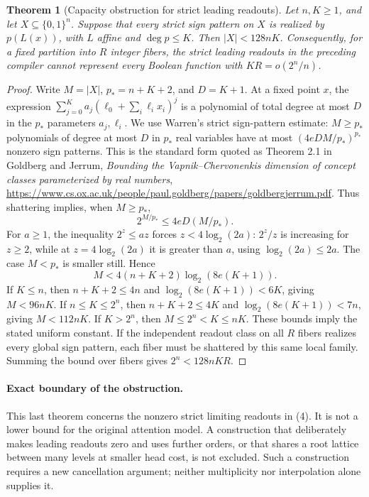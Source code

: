\documentclass[11pt]{article}
\newtheorem{theorem}{Theorem}
\begin{document}
\begin{theorem}[Capacity obstruction for strict leading readouts]
Let $n,K\ge1$, and let $X\subseteq\{0,1\}^n$. Suppose that every strict
sign pattern on $X$ is realized by $p(L(x))$, with $L$ affine and
$\deg p\le K$. Then $|X|<128nK$.
Consequently, for a fixed partition into $R$ integer fibers, the strict
leading readouts in the preceding compiler cannot represent every Boolean
function with $KR=o(2^n/n)$.
\end{theorem}
\begin{proof}
Write $M=|X|$, $p_*=n+K+2$, and $D=K+1$. At a fixed point $x$,
the expression $\sum_{j=0}^K a_j(\ell_0+\sum_i\ell_i x_i)^j$
is a polynomial of total degree at most $D$ in the $p_*$ parameters
$a_j,\ell_i$. We use Warren's strict sign-pattern estimate: $M\ge p_*$
polynomials of degree at most $D$ in $p_*$ real variables have at most
$(4eDM/p_*)^{p_*}$ nonzero sign patterns. This is the standard form
quoted as Theorem 2.1 in Goldberg and Jerrum,
\emph{Bounding the Vapnik--Chervonenkis dimension of concept classes
parameterized by real numbers},
\url{https://www.cs.ox.ac.uk/people/paul.goldberg/papers/goldbergjerrum.pdf}.
Thus shattering implies, when $M\ge p_*$,
\[
 2^{M/p_*}\le 4eD(M/p_*).
 \tag{14}
\]
For $a\ge1$, the inequality $2^z\le az$ forces
$z<4\log_2(2a)$: $2^z/z$ is increasing for $z\ge2$, while at
$z=4\log_2(2a)$ it is greater than $a$, using
$\log_2(2a)\le2a$. The case $M<p_*$ is smaller still. Hence
\[
 M<4(n+K+2)\log_2(8e(K+1)).
 \tag{15}
\]
If $K\le n$, then $n+K+2\le4n$ and
$\log_2(8e(K+1))<6K$, giving $M<96nK$.
If $n\le K\le2^n$, then $n+K+2\le4K$ and
$\log_2(8e(K+1))<7n$, giving $M<112nK$.
If $K>2^n$, then $M\le2^n<K\le nK$.
These bounds imply the stated uniform constant. If the independent
readout class on all $R$ fibers realizes every global sign pattern,
each fiber must be shattered by this same local family. Summing the
bound over fibers gives $2^n<128nKR$.
\end{proof}

\paragraph{Exact boundary of the obstruction.}
This last theorem concerns the nonzero strict limiting readouts in (4).
It is not a lower bound for the original attention model. A construction
that deliberately makes leading readouts zero and uses further orders,
or that shares a root lattice between many levels at smaller head cost,
is not excluded. Such a construction requires a new cancellation argument;
neither multiplicity nor interpolation alone supplies it.
\end{document}
